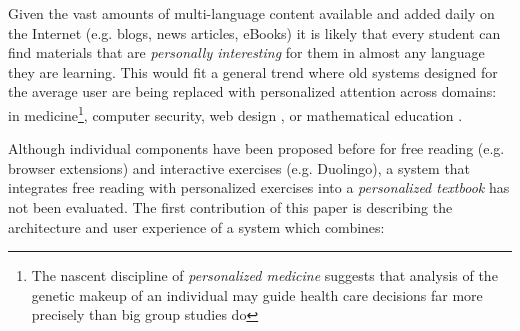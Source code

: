

Given the vast amounts of multi-language content available and added daily on the Internet (e.g. blogs, news articles, eBooks) it is likely that every student can find materials that are {\em personally interesting} for them in almost any language they are learning. 
This would fit a general trend where old systems designed for the average user are being replaced with personalized attention across domains: in medicine\footnote{The nascent discipline of {\em personalized medicine} suggests that analysis of the genetic makeup of an individual may guide health care decisions far more precisely than big group studies do}, computer security,  web design \cite{Reinecke13-CulturalAdaptation}, or mathematical education \cite{Polozov15-AdaptableMath}. 
% 
% 
% 
% 
% 
% 
% 


Although individual components have been proposed before for free reading (e.g. browser extensions) and interactive exercises (e.g. Duolingo), a system that integrates free reading with personalized exercises into a {\em personalized textbook} has not been evaluated. The first contribution of this paper is describing the architecture and user experience of a system which combines: 


